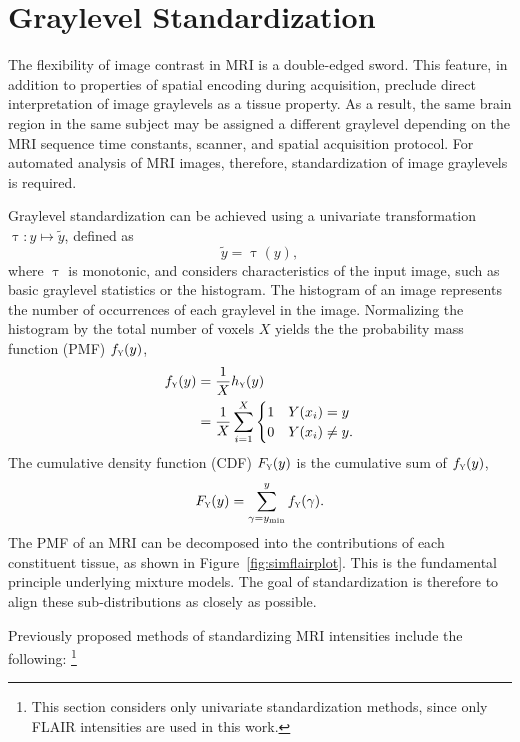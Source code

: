 \section{Graylevel Standardization}\label{s:pre-ystd}
The flexibility of image contrast in MRI is a double-edged sword.
This feature, in addition to properties of spatial encoding during acquisition,
preclude direct interpretation of image graylevels as a tissue property.
As a result, the same brain region in the same subject may be assigned a different graylevel
depending on the MRI sequence time constants, scanner, and spatial acquisition protocol.
For automated analysis of MRI images, therefore, standardization of image graylevels is required.
\par
Graylevel standardization can be achieved using a univariate transformation
$\uptau:y\mapsto\tilde{y}$, defined as
\begin{equation}
  \tilde{y} = \uptau(y),
\end{equation}
where $\uptau$ is monotonic, and considers characteristics of the input image,
such as basic graylevel statistics or the histogram.
The histogram of an image represents the number of occurrences of each graylevel in the image.
Normalizing the histogram by the total number of voxels $X$
yields the the probability mass function (PMF) $f_{\textsc{y}}(y)$,
\begin{align}
  f_{\textsc{y}}(y) &= \frac{1}{X}h_{\textsc{y}}(y)\nonumber\\
             &= \frac{1}{X}\sum_{i=1}^{X}
    \begin{cases}
      1 & Y(x_i) = y\\
      0 & Y(x_i) \ne y.\\
    \end{cases}
\end{align}
The cumulative density function (CDF) $F_{\textsc{y}}(y)$ is the cumulative sum of $f_{\textsc{y}}(y)$,
\begin{equation}
  F_{\textsc{y}}(y) = \sum_{\gamma=y_{\min}}^{y} f_{\textsc{y}}(\gamma).
\end{equation}
The PMF of an MRI can be decomposed into the contributions of each constituent tissue,
as shown in Figure~\ref{fig:simflairplot}.
This is the fundamental principle underlying mixture models.
The goal of standardization is therefore to align these sub-distributions as closely as possible.
\par
Previously proposed methods of standardizing MRI intensities include the following:%
\footnote{This section considers only univariate standardization methods,
  since only FLAIR intensities are used in this work.}
